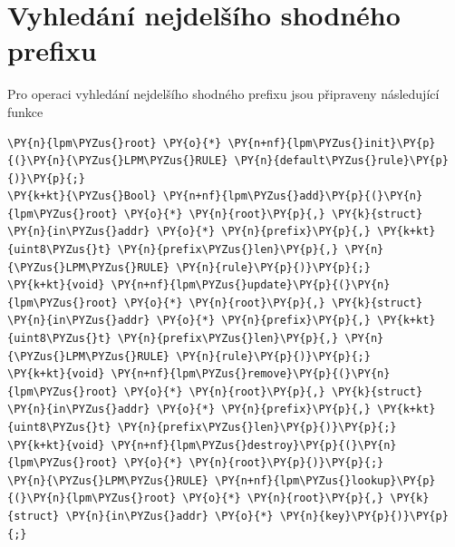 \section{Vyhledání nejdelšího shodného prefixu}
Pro operaci vyhledání nejdelšího shodného prefixu jsou připraveny následující funkce

\begin{Verbatim}[commandchars=\\\{\}]
\PY{n}{lpm\PYZus{}root} \PY{o}{*} \PY{n+nf}{lpm\PYZus{}init}\PY{p}{(}\PY{n}{\PYZus{}LPM\PYZus{}RULE} \PY{n}{default\PYZus{}rule}\PY{p}{)}\PY{p}{;}
\PY{k+kt}{\PYZus{}Bool} \PY{n+nf}{lpm\PYZus{}add}\PY{p}{(}\PY{n}{lpm\PYZus{}root} \PY{o}{*} \PY{n}{root}\PY{p}{,} \PY{k}{struct} \PY{n}{in\PYZus{}addr} \PY{o}{*} \PY{n}{prefix}\PY{p}{,} \PY{k+kt}{uint8\PYZus{}t} \PY{n}{prefix\PYZus{}len}\PY{p}{,} \PY{n}{\PYZus{}LPM\PYZus{}RULE} \PY{n}{rule}\PY{p}{)}\PY{p}{;}
\PY{k+kt}{void} \PY{n+nf}{lpm\PYZus{}update}\PY{p}{(}\PY{n}{lpm\PYZus{}root} \PY{o}{*} \PY{n}{root}\PY{p}{,} \PY{k}{struct} \PY{n}{in\PYZus{}addr} \PY{o}{*} \PY{n}{prefix}\PY{p}{,} \PY{k+kt}{uint8\PYZus{}t} \PY{n}{prefix\PYZus{}len}\PY{p}{,} \PY{n}{\PYZus{}LPM\PYZus{}RULE} \PY{n}{rule}\PY{p}{)}\PY{p}{;}
\PY{k+kt}{void} \PY{n+nf}{lpm\PYZus{}remove}\PY{p}{(}\PY{n}{lpm\PYZus{}root} \PY{o}{*} \PY{n}{root}\PY{p}{,} \PY{k}{struct} \PY{n}{in\PYZus{}addr} \PY{o}{*} \PY{n}{prefix}\PY{p}{,} \PY{k+kt}{uint8\PYZus{}t} \PY{n}{prefix\PYZus{}len}\PY{p}{)}\PY{p}{;}
\PY{k+kt}{void} \PY{n+nf}{lpm\PYZus{}destroy}\PY{p}{(}\PY{n}{lpm\PYZus{}root} \PY{o}{*} \PY{n}{root}\PY{p}{)}\PY{p}{;}
\PY{n}{\PYZus{}LPM\PYZus{}RULE} \PY{n+nf}{lpm\PYZus{}lookup}\PY{p}{(}\PY{n}{lpm\PYZus{}root} \PY{o}{*} \PY{n}{root}\PY{p}{,} \PY{k}{struct} \PY{n}{in\PYZus{}addr} \PY{o}{*} \PY{n}{key}\PY{p}{)}\PY{p}{;}
\end{Verbatim}

